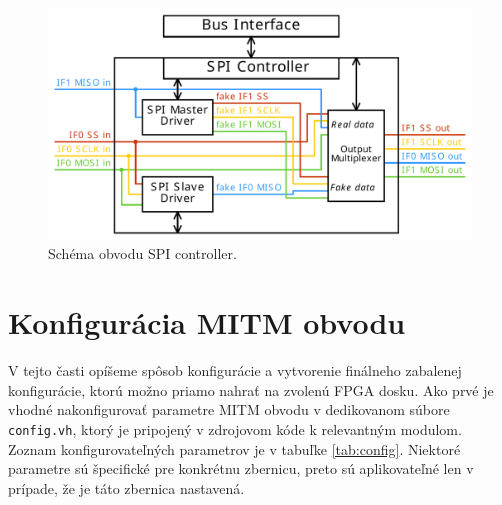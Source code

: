 \begin{figure}
    \centerline{\includegraphics[width=1\textwidth]{images/designs/spiController.pdf}}
    \caption[Schéma obvodu SPI controller]{Schéma obvodu SPI controller.}
    \label{obr:spiController}
\end{figure}

\section{Konfigurácia MITM obvodu}
V tejto časti opíšeme spôsob konfigurácie a vytvorenie finálneho zabalenej konfigurácie, ktorú možno priamo nahrať na zvolenú FPGA dosku. Ako prvé je vhodné nakonfigurovať parametre MITM obvodu v dedikovanom súbore \texttt{config.vh}, ktorý je pripojený v zdrojovom kóde k relevantným modulom. Zoznam konfigurovateľných parametrov je v tabuľke \ref{tab:config}. Niektoré parametre sú špecifické pre konkrétnu zbernicu, preto sú aplikovateľné len v prípade, že je táto zbernica nastavená.

